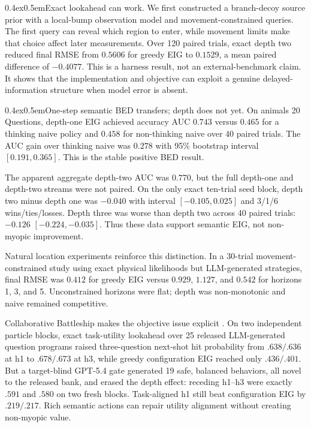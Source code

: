 \documentclass[10pt]{article}
\makeatletter
\renewcommand\paragraph{\@startsection{paragraph}{4}{0pt}%
  {0.4ex}{0.5em}{\normalfont\normalsize\bfseries}}
\makeatother
\begin{document}
\paragraph{Exact lookahead can work.}
We first constructed a branch-decoy source prior with a local-bump observation
model and movement-constrained queries. The first query can reveal which region
to enter, while movement limits make that choice affect later measurements. Over
120 paired trials, exact depth two reduced final RMSE from $0.5606$ for greedy
EIG to $0.1529$, a mean paired difference of $-0.4077$. This is a harness result,
not an external-benchmark claim. It shows that the implementation and objective
can exploit a genuine delayed-information structure when model error is absent.

\paragraph{One-step semantic BED transfers; depth does not yet.}
On animals 20 Questions, depth-one EIG achieved accuracy AUC $0.743$ versus
$0.465$ for a thinking naive policy and $0.458$ for non-thinking naive over 40
paired trials. The AUC gain over thinking naive was $0.278$ with 95\% bootstrap
interval $[0.191,0.365]$. This is the stable positive BED result.

The apparent aggregate depth-two AUC was $0.770$, but the full depth-one and
depth-two streams were not paired. On the only exact ten-trial seed block,
depth two minus depth one was $-0.040$ with interval $[-0.105,0.025]$ and
3/1/6 wins/ties/losses. Depth three was worse than depth two across 40 paired
trials: $-0.126$ $[-0.224,-0.035]$. Thus these data support semantic EIG, not
non-myopic improvement.

Natural location experiments reinforce this distinction. In a 30-trial
movement-constrained study using exact physical likelihoods but LLM-generated
strategies, final RMSE was $0.412$ for greedy EIG versus $0.929$, $1.127$, and
$0.542$ for horizons 1, 3, and 5. Unconstrained horizons were flat; depth was
non-monotonic and naive remained competitive.

Collaborative Battleship makes the objective issue explicit
\citep{grand2026shoot}. On two independent particle blocks, exact task-utility
lookahead over 25 released LLM-generated question programs raised
three-question next-shot hit probability from $.638/.636$ at h1 to
$.678/.673$ at h3, while greedy configuration EIG reached only $.436/.401$.
But a target-blind GPT-5.4 gate generated 19 safe, balanced behaviors, all
novel to the released bank, and erased the depth effect: receding h1--h3 were
exactly $.591$ and $.580$ on two fresh blocks. Task-aligned h1 still beat
configuration EIG by $.219/.217$. Rich semantic actions can repair utility
alignment without creating non-myopic value.
\end{document}
